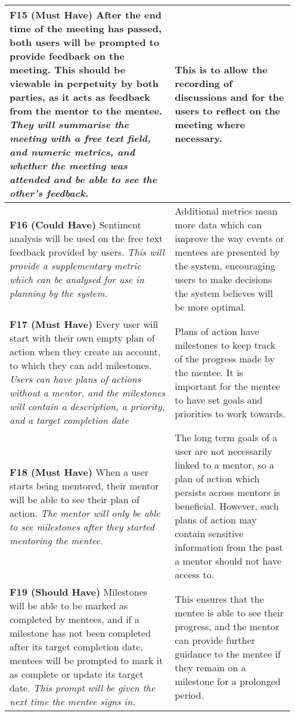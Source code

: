 \documentclass[10pt]{article}
\begin{document}
\begin{longtable}{|p{0.55\linewidth}|p{0.4\linewidth}|}
    \textbf{F15 (Must Have) }
    After the end time of the meeting has passed, both users will be prompted to
    provide feedback on the meeting. This should be viewable in perpetuity by
    both parties, as it acts as feedback from the mentor to the mentee.
    \textit{They will summarise the meeting with a free text field, and numeric
    metrics, and whether the meeting was attended and be able to see the other's
    feedback.}
        &
    This is to allow the recording of discussions and for the users to reflect
    on the meeting where necessary.
    \\ \hline

    \textbf{F16 (Could Have) }
    Sentiment analysis will be used on the free text feedback provided by users.
    \textit{This will provide a supplementary metric which can be analysed for
    use in planning by the system.}
        &
    Additional metrics mean more data which can improve the way events or
    mentees are presented by the system, encouraging users to make decisions the
    system believes will be more optimal.
    \\ \hline


    \textbf{F17 (Must Have) }
    Every user will start with their own empty plan of action when they create
    an account, to which they can add milestones.
    \textit{Users can have plans of actions without a mentor, and the milestones
    will contain a description, a priority, and a target completion date}
        &
    Plans of action have milestones to keep track of the progress made by the
    mentee. It is important for the mentee to have set goals and priorities to
    work towards.
    \\ \hline

    \textbf{F18 (Must Have) }
    When a user starts being mentored, their mentor will be able to see their
    plan of action.
    \textit{The mentor will only be able to see milestones after they started
    mentoring the mentee.}
        &
    The long term goals of a user are not necessarily linked to a mentor, so
    a plan of action which persists across mentors is beneficial. However, such
    plans of action may contain sensitive information from the past a mentor
    should not have access to.
    \\ \hline

    \textbf{F19 (Should Have) }
    Milestones will be able to be marked as completed by mentees, and if a
    milestone has not been completed after its target completion date, mentees
    will be prompted to mark it as complete or update its target date.
    \textit{This prompt will be given the next time the mentee signs in.}
        &
    This ensures that the mentee is able to see their progress, and the mentor
    can provide further guidance to the mentee if they remain on a milestone for
    a prolonged period.
    \\ \hline


\end{longtable}
\end{document}

